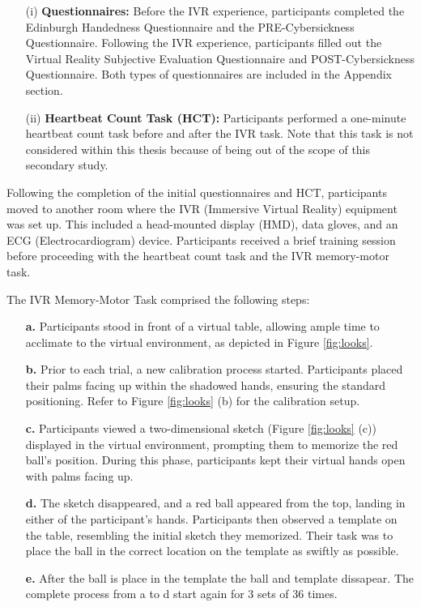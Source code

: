 \documentclass[12pt,oneside,openright]{report}
\begin{document}
\begin{enumerate}
\item[(i)] \textbf{Questionnaires:} Before the IVR experience, participants completed the Edinburgh Handedness Questionnaire and the PRE-Cybersickness Questionnaire. Following the IVR experience, participants filled out the Virtual Reality Subjective Evaluation Questionnaire and POST-Cybersickness Questionnaire. Both types of questionnaires are included in the Appendix section.

\item[(ii)] \textbf{Heartbeat Count Task (HCT):} Participants performed a one-minute heartbeat count task before and after the IVR task. Note that this task is not considered within this thesis because of being out of the scope of this secondary study.
\end{enumerate}

Following the completion of the initial questionnaires and HCT, participants moved to another room where the IVR (Immersive Virtual Reality) equipment was set up. This included a head-mounted display (HMD), data gloves, and an ECG (Electrocardiogram) device. Participants received a brief training session before proceeding with the heartbeat count task and the IVR memory-motor task.


The IVR Memory-Motor Task comprised the following steps:
\begin{enumerate}
    \item[\textbf{a.}] Participants stood in front of a virtual table, allowing ample time to acclimate to the virtual environment, as depicted in Figure \ref{fig:looks}.
    
    \item[\textbf{b.}] Prior to each trial, a new calibration process started. Participants placed their palms facing up within the shadowed hands, ensuring the standard positioning. Refer to Figure \ref{fig:looks} (b) for the calibration setup.
    
    \item[\textbf{c.}] Participants viewed a two-dimensional sketch (Figure \ref{fig:looks} (c)) displayed in the virtual environment, prompting them to memorize the red ball's position. During this phase, participants kept their virtual hands open with palms facing up.
    
    \item[\textbf{d.}] The sketch disappeared, and a red ball appeared from the top, landing in either of the participant's hands. Participants then observed a template on the table, resembling the initial sketch they memorized. Their task was to place the ball in the correct location on the template as swiftly as possible.
    \item[\textbf{e.}] After the ball is place in the template the ball and template dissapear. The complete process from a to d start again for 3 sets of 36 times. 
\end{enumerate}
\end{document}
